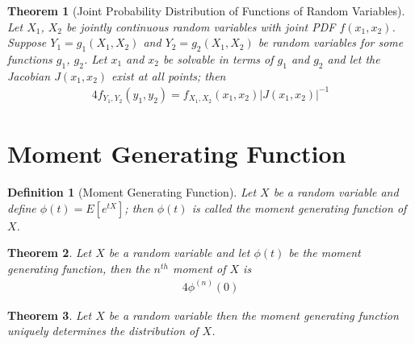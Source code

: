 \documentclass[11pt, oneside]{book}   	%
\newtheorem{definition}{Definition}[chapter]
\newtheorem{theorem}{Theorem}[chapter]
\begin{document}
\begin{theorem}[Joint Probability Distribution of Functions of Random Variables]
	Let $X_1$, $X_2$ be jointly continuous random variables with joint PDF $f(x_1, x_2)$. Suppose $Y_1=g_1(X_1, X_2)$ and $Y_2=g_2(X_1, X_2)$ be random variables for some functions $g_1$, $g_2$. Let $x_1$ and $x_2$ be solvable in terms of $g_1$ and $g_2$ and let the Jacobian $J(x_1, x_2)$ exist at all points; then
	\begin{alignat}{4}
		f_{Y_1, Y_2}(y_1, y_2)=f_{X_1, X_2}(x_1, x_2)\left|J(x_1, x_2)\right|^{-1}
	\end{alignat}
\end{theorem}

\section{Moment Generating Function}

\begin{definition}[Moment Generating Function]
	Let $X$ be a random variable and define $\phi(t)=E\left[e^{tX}\right]$; then $\phi(t)$ is called the moment generating function of $X$. 
\end{definition}

\begin{theorem}
	Let $X$ be a random variable and let $\phi(t)$ be the moment generating function, then the $n^{th}$ moment of $X$ is 
	\begin{alignat}{4}
		\phi^{(n)}(0)
	\end{alignat}
\end{theorem}

\begin{theorem}
	Let $X$ be a random variable then the moment generating function uniquely determines the distribution of $X$. 
\end{theorem}

\clearpage
{}
\printindex
\end{document}
